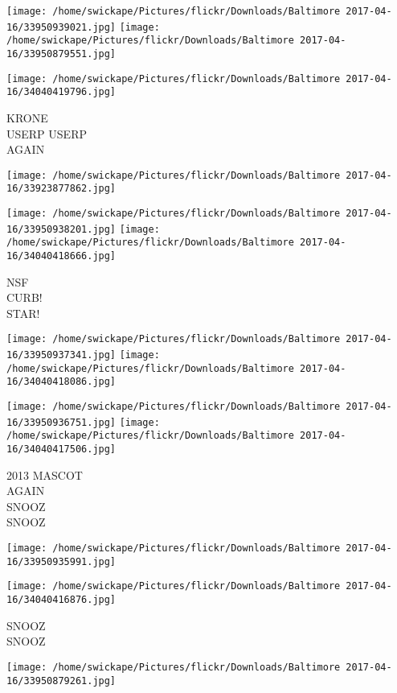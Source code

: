 \documentclass[10pt,letterpaper]{article}
\begin{document}
\texttt{[image: /home/swickape/Pictures/flickr/Downloads/Baltimore 2017-04-16/33950939021.jpg]}
\texttt{[image: /home/swickape/Pictures/flickr/Downloads/Baltimore 2017-04-16/33950879551.jpg]}

\texttt{[image: /home/swickape/Pictures/flickr/Downloads/Baltimore 2017-04-16/34040419796.jpg]}

KRONE\\
USERP USERP\\
AGAIN\\
\pagebreak

\texttt{[image: /home/swickape/Pictures/flickr/Downloads/Baltimore 2017-04-16/33923877862.jpg]}

\vspace{0.25in}
\texttt{[image: /home/swickape/Pictures/flickr/Downloads/Baltimore 2017-04-16/33950938201.jpg]}
\texttt{[image: /home/swickape/Pictures/flickr/Downloads/Baltimore 2017-04-16/34040418666.jpg]}

NSF\\
CURB!\\
STAR!\\
\pagebreak

\texttt{[image: /home/swickape/Pictures/flickr/Downloads/Baltimore 2017-04-16/33950937341.jpg]}
\texttt{[image: /home/swickape/Pictures/flickr/Downloads/Baltimore 2017-04-16/34040418086.jpg]}

\texttt{[image: /home/swickape/Pictures/flickr/Downloads/Baltimore 2017-04-16/33950936751.jpg]}
\texttt{[image: /home/swickape/Pictures/flickr/Downloads/Baltimore 2017-04-16/34040417506.jpg]}

2013 MASCOT\\
AGAIN\\
SNOOZ\\
SNOOZ\\
\pagebreak

\texttt{[image: /home/swickape/Pictures/flickr/Downloads/Baltimore 2017-04-16/33950935991.jpg]}

\vspace{0.25in}
\texttt{[image: /home/swickape/Pictures/flickr/Downloads/Baltimore 2017-04-16/34040416876.jpg]}

SNOOZ\\
SNOOZ\\
\pagebreak

\texttt{[image: /home/swickape/Pictures/flickr/Downloads/Baltimore 2017-04-16/33950879261.jpg]}
\end{document}
